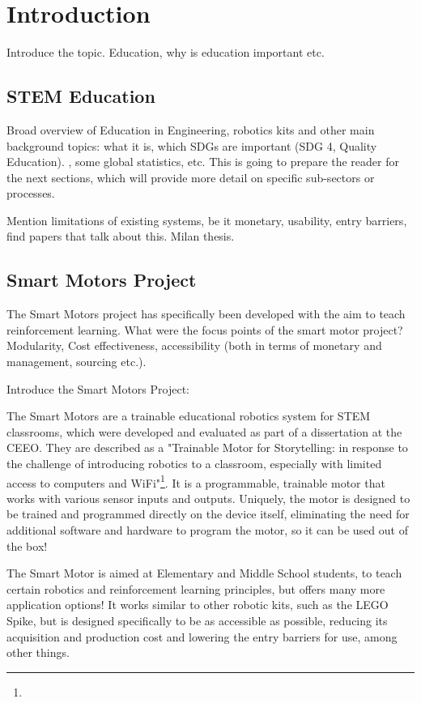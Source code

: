 \cleardoublepage%
\chapter{\label{chap:intro}Introduction}%

Introduce the topic. Education, why is education important etc.

\section{\label{sec:intro_ee}STEM Education}%

Broad overview of Education in Engineering, robotics kits and other main background topics:  what it is, which SDGs are important (SDG 4, Quality Education). , some global statistics, etc.  This is going to prepare the reader for the next sections, which will provide more detail on specific sub-sectors or processes.

Mention limitations of existing systems, be it monetary, usability, entry barriers, find papers that talk about this. Milan thesis.

\section{\label{sec:intro_smp}Smart Motors Project}%

The Smart Motors project has specifically been developed with the aim to teach reinforcement learning. 
What were the focus points of the smart motor project? Modularity, Cost effectiveness, accessibility (both in terms of monetary and management, sourcing etc.). \citep{smartmotors}

Introduce the Smart Motors Project:

The Smart Motors are a trainable educational robotics system for STEM classrooms, which were developed and evaluated as part of a dissertation at the CEEO. They are described as a "Trainable Motor for Storytelling: in response to the challenge of introducing robotics to a classroom, especially with limited access to computers and WiFi"\footnote{}.
It is a programmable, trainable motor that works with various sensor inputs and outputs. Uniquely, the motor is designed to be trained and programmed directly on the device itself, eliminating the need for additional software and hardware to program the motor, so it can be used out of the box!

The Smart Motor is aimed at Elementary and Middle School students, to teach certain robotics and reinforcement learning principles, but offers many more application options! It works similar to other robotic kits, such as the LEGO Spike, but is designed specifically to be as accessible as possible, reducing its acquisition and production cost and lowering the entry barriers for use, among other things.

